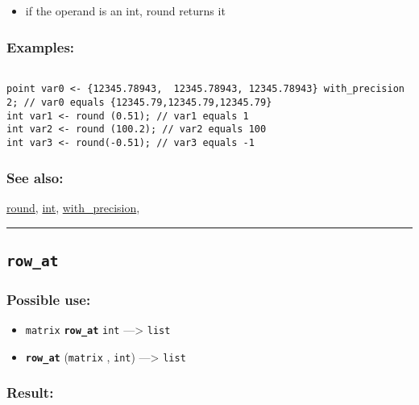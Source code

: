 \documentclass[]{book}
\providecommand{\tightlist}{%
  \setlength{\itemsep}{0pt}\setlength{\parskip}{0pt}}
\theoremstyle{definition}
\theoremstyle{definition}
\theoremstyle{definition}
\theoremstyle{remark}
\begin{document}
\begin{itemize}
\tightlist
\item
  if the operand is an int, round returns it
\end{itemize}

\subsubsection{Examples:}\label{examples-306}

\begin{verbatim}
 
point var0 <- {12345.78943,  12345.78943, 12345.78943} with_precision 2; // var0 equals {12345.79,12345.79,12345.79} 
int var1 <- round (0.51); // var1 equals 1 
int var2 <- round (100.2); // var2 equals 100 
int var3 <- round(-0.51); // var3 equals -1
\end{verbatim}

\subsubsection{See also:}\label{see-also-180}

\href{OperatorsNR\#round}{round}, \href{OperatorsIM\#int}{int},
\href{OperatorsSZ\#with_precision}{with\_precision},

\begin{center}\rule{0.5\linewidth}{\linethickness}\end{center}

\subsection{\texorpdfstring{\texttt{row\_at}}{row\_at}}\label{row_at}

\subsubsection{Possible use:}\label{possible-use-446}

\begin{itemize}
\tightlist
\item
  \texttt{matrix} \textbf{\texttt{row\_at}} \texttt{int}
  ---\textgreater{} \texttt{list}
\item
  \textbf{\texttt{row\_at}} (\texttt{matrix} , \texttt{int})
  ---\textgreater{} \texttt{list}
\end{itemize}

\subsubsection{Result:}\label{result-432}
\end{document}
